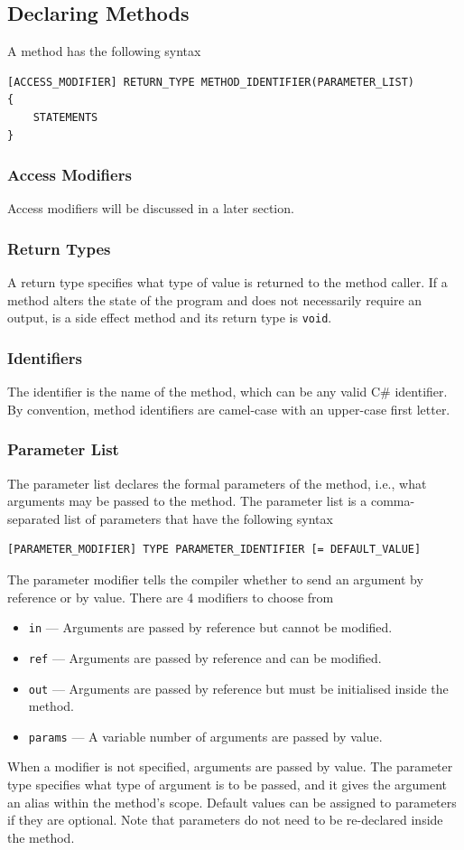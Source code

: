 \documentclass{article}
\begin{document}
\subsection{Declaring Methods}
A method has the following syntax
\begin{verbatim}
[ACCESS_MODIFIER] RETURN_TYPE METHOD_IDENTIFIER(PARAMETER_LIST)
{
    STATEMENTS
}
\end{verbatim}
\subsubsection{Access Modifiers}
Access modifiers will be discussed in a later section.
\subsubsection{Return Types}
A return type specifies what type of value is returned to the method
caller. If a method alters the state of the program and does not
necessarily require an output, is a side effect method and its return
type is \texttt{void}.
\subsubsection{Identifiers}
The identifier is the name of the method, which can be any valid C\#
identifier. By convention, method identifiers are camel-case with an
upper-case first letter.
\subsubsection{Parameter List}
The parameter list declares the formal parameters of the method, i.e.,
what arguments may be passed to the method. The parameter list is a
comma-separated list of parameters that have the following syntax
\begin{verbatim}
[PARAMETER_MODIFIER] TYPE PARAMETER_IDENTIFIER [= DEFAULT_VALUE]
\end{verbatim}
The parameter modifier tells the compiler whether to send an argument
by reference or by value. There are 4 modifiers to choose from
\begin{itemize}
    \item \texttt{in} --- Arguments are passed by reference but cannot be modified.
    \item \texttt{ref} --- Arguments are passed by reference and can be modified.
    \item \texttt{out} --- Arguments are passed by reference but must be initialised inside the method.
    \item \texttt{params} --- A variable number of arguments are passed by value.
\end{itemize}
When a modifier is not specified, arguments are passed by value.
The parameter type specifies what type of argument is to be passed, and
it gives the argument an alias within the method's scope. Default values
can be assigned to parameters if they are optional.
Note that parameters do not need to be re-declared inside the method.
\end{document}
